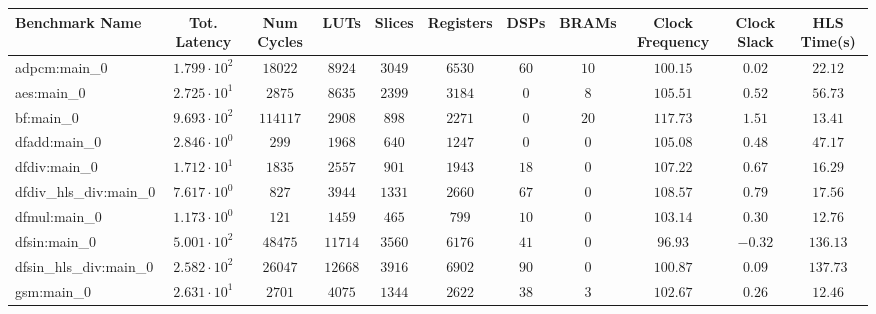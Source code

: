 \begin{tabular}{|l|c|c|c|c|c|c|c|c|c|c|}
\hline
Benchmark Name          & Tot. Latency           & Num Cycles & LUTs      & Slices    & Registers & DSPs    & BRAMs   & Clock Frequency & Clock Slack & HLS Time(s) \\
\hline
adpcm:main\_0           & $ 1.799 \cdot 10^{2} $ & $ 18022  $ & $ 8924  $ & $ 3049  $ & $ 6530  $ & $ 60  $ & $ 10  $ & $ 100.15      $ & $ 0.02    $ & $ 22.12   $ \\
aes:main\_0             & $ 2.725 \cdot 10^{1} $ & $ 2875   $ & $ 8635  $ & $ 2399  $ & $ 3184  $ & $ 0   $ & $ 8   $ & $ 105.51      $ & $ 0.52    $ & $ 56.73   $ \\
bf:main\_0              & $ 9.693 \cdot 10^{2} $ & $ 114117 $ & $ 2908  $ & $ 898   $ & $ 2271  $ & $ 0   $ & $ 20  $ & $ 117.73      $ & $ 1.51    $ & $ 13.41   $ \\
dfadd:main\_0           & $ 2.846 \cdot 10^{0} $ & $ 299    $ & $ 1968  $ & $ 640   $ & $ 1247  $ & $ 0   $ & $ 0   $ & $ 105.08      $ & $ 0.48    $ & $ 47.17   $ \\
dfdiv:main\_0           & $ 1.712 \cdot 10^{1} $ & $ 1835   $ & $ 2557  $ & $ 901   $ & $ 1943  $ & $ 18  $ & $ 0   $ & $ 107.22      $ & $ 0.67    $ & $ 16.29   $ \\
dfdiv\_hls\_div:main\_0 & $ 7.617 \cdot 10^{0} $ & $ 827    $ & $ 3944  $ & $ 1331  $ & $ 2660  $ & $ 67  $ & $ 0   $ & $ 108.57      $ & $ 0.79    $ & $ 17.56   $ \\
dfmul:main\_0           & $ 1.173 \cdot 10^{0} $ & $ 121    $ & $ 1459  $ & $ 465   $ & $ 799   $ & $ 10  $ & $ 0   $ & $ 103.14      $ & $ 0.30    $ & $ 12.76   $ \\
dfsin:main\_0           & $ 5.001 \cdot 10^{2} $ & $ 48475  $ & $ 11714 $ & $ 3560  $ & $ 6176  $ & $ 41  $ & $ 0   $ & $ 96.93       $ & $ -0.32   $ & $ 136.13  $ \\
dfsin\_hls\_div:main\_0 & $ 2.582 \cdot 10^{2} $ & $ 26047  $ & $ 12668 $ & $ 3916  $ & $ 6902  $ & $ 90  $ & $ 0   $ & $ 100.87      $ & $ 0.09    $ & $ 137.73  $ \\
gsm:main\_0             & $ 2.631 \cdot 10^{1} $ & $ 2701   $ & $ 4075  $ & $ 1344  $ & $ 2622  $ & $ 38  $ & $ 3   $ & $ 102.67      $ & $ 0.26    $ & $ 12.46   $ \\

\end{tabular}
